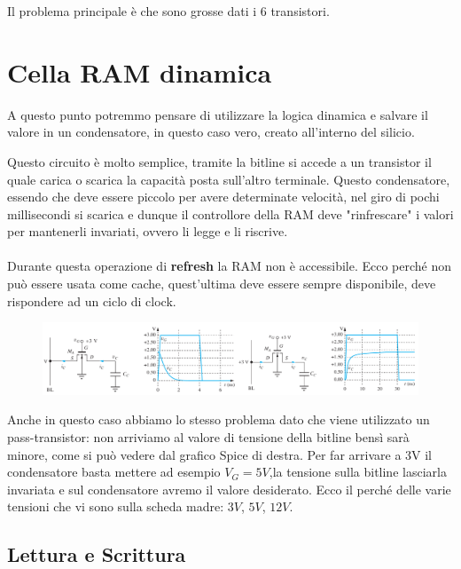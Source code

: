 Il problema principale è che sono grosse dati i 6 transistori.

\section{Cella RAM dinamica}

A questo punto potremmo pensare di utilizzare la logica dinamica e salvare il valore in un condensatore, in questo caso vero, creato all'interno del silicio.

Questo circuito è molto semplice, tramite la bitline si accede a un transistor il quale carica o scarica la capacità posta sull'altro terminale. Questo condensatore, essendo che deve essere piccolo per avere determinate velocità, nel giro di pochi millisecondi si scarica e dunque il controllore della RAM deve "rinfrescare" i valori per mantenerli invariati, ovvero li legge e li riscrive.

\paragraph{}
Durante questa operazione di \textbf{refresh} la RAM non è accessibile. Ecco perché non può essere usata come cache, quest'ultima deve essere sempre disponibile, deve rispondere ad un ciclo di clock.


\begin{figure}[htbp]
    \centering
    \includegraphics[width=1\linewidth]{img/ram_dinamica.png}
\end{figure}

Anche in questo caso abbiamo lo stesso problema dato che viene utilizzato un pass-transistor: non arriviamo al valore di tensione della bitline bensì sarà minore, come si può vedere dal grafico Spice di destra. Per far arrivare a 3V il condensatore basta mettere ad esempio $V_G = 5V$,la tensione sulla bitline lasciarla invariata e sul condensatore avremo il valore desiderato. Ecco il perché delle varie tensioni che vi sono sulla scheda madre: $3V$, $5V$, $12V$.

\subsection{Lettura e Scrittura}

